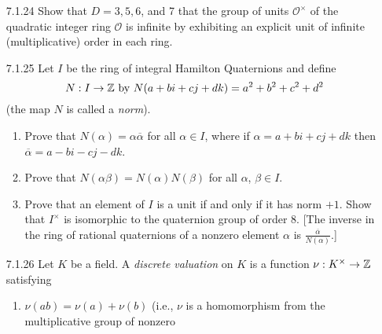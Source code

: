 \begin{enumerate}
      We conclude that $F = \mathcal{O}_k$, so that
      $$n = [\mathcal{O} : F] = [\mathcal{O} : \mathcal{O}_k] = k.$$
      That is, $F = \mathcal{O}_k = \mathcal{O}_n$. \qed
   \item[7.1.24]  Show that $D = 3, 5, 6$, and 7 that the group of units
                  $\mathcal{O}^\times$ of the quadratic integer ring
                  $\mathcal{O}$  is infinite by exhibiting an explicit unit of
                  infinite (multiplicative) order in each ring.
   \item[7.1.25]  Let $I$ be the ring of integral Hamilton Quaternions and
                  define
                  $$N : I \rightarrow \mathbb{Z} \text{ by }
                    N(a + bi + cj + dk) = a^2 + b^2 + c^2 + d^2$$
                  (the map $N$ is called a \textit{norm}).
                  \begin{enumerate}
                     \item Prove that $N(\alpha) = \alpha\overline{\alpha}$ for
                           all $\alpha \in I$, where if
                           $\alpha = a + bi + cj + dk$ then
                           $\overline{\alpha} = a - bi - cj - dk$.
                     \item Prove that $N(\alpha\beta) = N(\alpha)N(\beta)$ for
                           all $\alpha$, $\beta \in I$.
                     \item Prove that an element of $I$ is a unit if and only if
                           it has norm $+1$. Show that $I^\times$ is isomorphic
                           to the quaternion group of order 8. [The inverse in
                           the ring of rational quaternions of a nonzero element
                           $\alpha$ is $\frac{\overline{\alpha}}{N(\alpha)}$.]
                  \end{enumerate}
   \item[7.1.26]  Let $K$ be a field. A \textit{discrete valuation} on $K$ is a
                  function $\nu : K^\times \rightarrow \mathbb{Z}$ satisfying
                  \begin{enumerate}\renewcommand{\labelenumii}{(\roman{enumii})}
                     \item $\nu(ab) = \nu(a) + \nu(b)$ (i.e., $\nu$ is a
                           homomorphism from the multiplicative group of nonzero

\end{enumerate}
\end{enumerate}
